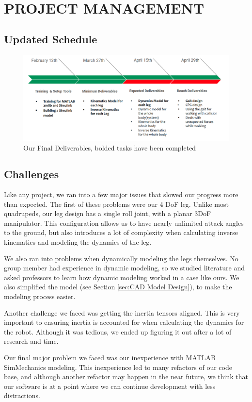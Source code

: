 \section{PROJECT MANAGEMENT}
\subsection{Updated Schedule}
    \begin{figure}[thpb]
        \parbox{\linewidth}{\includegraphics[width=\linewidth]{Figures/FinalDeliverables.png}}
        \caption{Our Final Deliverables, bolded tasks have been completed}
        \label{fig:FinalDeliverables}
    \end{figure}
\subsection{Challenges}
Like any project, we ran into a few major issues that slowed our progress more than expected. The first of these problems were our 4 DoF leg. Unlike most quadrupeds, our leg design has a single roll joint, with a planar 3DoF manipulator. This configuration allows us to have nearly unlimited attack angles to the ground, but also introduces a lot of complexity when calculating inverse kinematics and modeling the dynamics of the leg.

We also ran into problems when dynamically modeling the legs themselves. No group member had experience in dynamic modeling, so we studied literature and asked professors to learn how dynamic modeling worked in a case like ours. We also simplified the model (see Section \ref{sec:CAD Model Design}), to make the modeling process easier.

Another challenge we faced was getting the inertia tensors aligned. This is very important to ensuring inertia is accounted for when calculating the dynamics for the robot. Although it was tedious, we ended up figuring it out after a lot of research and time.

Our final major problem we faced was our inexperience with MATLAB SimMechanics modeling. This inexperience led to many refactors of our code base, and although another refactor may happen in the near future, we think that our software is at a point where we can continue development with less distractions.